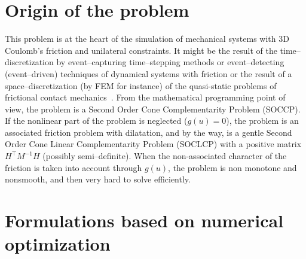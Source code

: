 \documentclass[11pt,a4paper]{article}
\begin{document}
\vspace{-0.5cm}\section{Origin of the problem}
  This problem is at the heart of the simulation of mechanical systems with 3D Coulomb's friction and unilateral constraints. It might be the result of the time--discretization by event--capturing time--stepping methods or event--detecting (event--driven) techniques of dynamical systems with friction or the result of a space--discretization (by FEM for instance) of the quasi-static problems of frictional contact mechanics~\cite{Acary.Cadoux2013}. From the mathematical programming point of view, the problem is a Second Order Cone Complementarity Problem (SOCCP). If the nonlinear part of the problem is neglected ($g(u)=0$), the problem is an associated friction problem with dilatation, and by the way, is a gentle Second Order Cone Linear Complementarity Problem (SOCLCP) with a positive matrix $H^\top M^{-1} H$ (possibly semi--definite). When the non-associated character of the friction is taken into account through $g(u)$, the problem is non monotone and nonsmooth, and then very hard to solve efficiently.

\vspace{-0.6cm}\section{Formulations based on numerical optimization}
  
\end{document}
